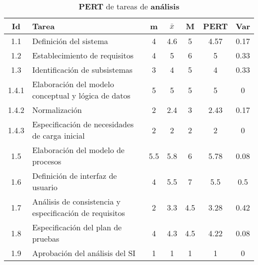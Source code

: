 \documentclass[11pt,a4paper,spanish,twoside]{report}
\begin{document}
\begin{table}[!h]
  \centering
  \begin{tabular}{|c||p{5.3cm}||c|c|c||c|c|}
    \hline
    \textbf{Id} & \textbf{Tarea} & \textbf{m} & 
    \textbf{$\bar{x}$} &\textbf{M} & \textbf{PERT} & \textbf{Var}\\
    \hline \hline
    1.1 & Definición del sistema & 4 & 4.6 & 5 & 4.57 & 0.17\\ 
    \hline
    1.2 & Establecimiento de requisitos & 4 & 5 & 6 & 5 & 0.33\\
    \hline 
    1.3 & Identificación de subsistemas & 3 & 4 & 5 & 4 & 0.33\\
    \hline
    1.4.1 & Elaboración del modelo conceptual y lógica de datos & 5 & 5 & 5 &
    5 & 0\\
    \hline
    1.4.2 & Normalización & 2 & 2.4 & 3 & 2.43 & 0.17\\
    \hline
    1.4.3 & Especificación de necesidades de carga inicial & 2 & 2 & 2 & 2 & 0\\
    \hline
    1.5 & Elaboración del modelo de procesos & 5.5 & 5.8 & 6 & 5.78 & 0.08\\
    \hline
    1.6 & Definición de interfaz de usuario & 4 & 5.5 & 7 & 5.5 & 0.5\\
    \hline
    1.7 & Análisis de consistencia y especificación de requisitos & 2 & 3.3
    & 4.5 & 3.28 & 0.42\\
    \hline
    1.8 & Especificación del plan de pruebas & 4 & 4.3 & 4.5 & 4.22 & 0.08\\
    \hline
    1.9 & Aprobación del análisis del SI & 1 & 1 & 1 & 1 & 0\\
    \hline
  \end{tabular}
  \caption{\textbf{PERT} de tareas de \textbf{análisis}} 
  \label{Tab:tareas1}
\end{table}
\end{document}
